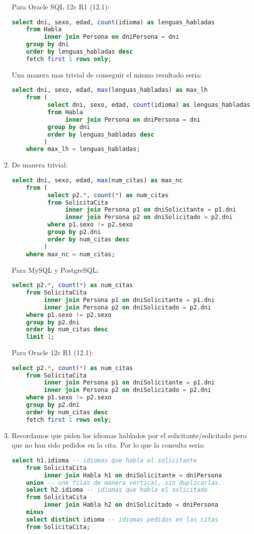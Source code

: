 \begin{enumerate}
	Para Oracle SQL 12c R1 (12.1):
	\begin{lstlisting}[language=sql]
	select dni, sexo, edad, count(idioma) as lenguas_habladas
	from Habla
		 inner join Persona on dniPersona = dni
	group by dni
	order by lenguas_habladas desc
	fetch first 1 rows only;\end{lstlisting}
	
	Una manera mas trivial de conseguir el mismo resultado seria:
	\begin{lstlisting}[language=sql]
	select dni, sexo, edad, max(lenguas_habladas) as max_lh
	from (
		  select dni, sexo, edad, count(idioma) as lenguas_habladas
		  from Habla
			   inner join Persona on dniPersona = dni
		  group by dni
		  order by lenguas_habladas desc
		 )
	where max_lh = lenguas_habladas;\end{lstlisting}	
	\newpage

	\item De manera trivial:
	\begin{lstlisting}[language=sql]
	select dni, sexo, edad, max(num_citas) as max_nc
	from (
		  select p2.*, count(*) as num_citas
		  from SolicitaCita
		  	   inner join Persona p1 on dniSolicitante = p1.dni
		  	   inner join Persona p2 on dniSolicitado = p2.dni
		  where p1.sexo != p2.sexo
		  group by p2.dni
		  order by num_citas desc
		 )
	where max_nc = num_citas;\end{lstlisting}
	
	Para MySQL y PostgreSQL:
	\begin{lstlisting}[language=sql]
	select p2.*, count(*) as num_citas
	from SolicitaCita
		 inner join Persona p1 on dniSolicitante = p1.dni
		 inner join Persona p2 on dniSolicitado = p2.dni
	where p1.sexo != p2.sexo
	group by p2.dni
	order by num_citas desc
	limit 1;\end{lstlisting}
	
	Para Oracle 12c R1 (12.1):
	\begin{lstlisting}[language=sql]
	select p2.*, count(*) as num_citas
	from SolicitaCita
	 	 inner join Persona p1 on dniSolicitante = p1.dni
		 inner join Persona p2 on dniSolicitado = p2.dni
	where p1.sexo != p2.sexo
	group by p2.dni
	order by num_citas desc
	fetch first 1 rows only;\end{lstlisting}
	\newpage
	
	\item Recordamos que piden los idiomas hablados por el solicitante/solicitado pero que no han sido pedidos en la cita. Por lo que la consulta seria:
	\begin{lstlisting}[language=sql]
	select h1.idioma -- idiomas que habla el solicitante
	from SolicitaCita
		 inner join Habla h1 on dniSolicitante = dniPersona
	union -- une filas de manera vertical, sin duplicarlas.
	select h2.idioma -- idiomas que habla el solicitado
	from SolicitaCita
		 inner join Habla h2 on dniSolicitado = dniPersona
	minus
	select distinct idioma -- idiomas pedidos en las citas
	from SolicitaCita;\end{lstlisting}
	

\end{enumerate}
